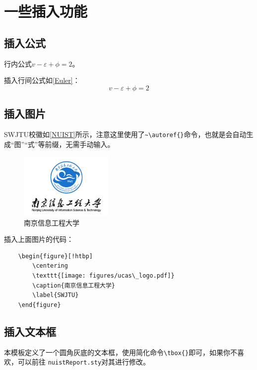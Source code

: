 \section{一些插入功能}
\subsection{插入公式}
行内公式$v-\varepsilon+\phi=2$。

插入行间公式如\autoref{Euler}：
\begin{equation}
    v-\varepsilon+\phi=2
    \label{Euler}
\end{equation}

\subsection{插入图片}
SWJTU校徽如\autoref{NUIST}所示，注意这里使用了\verb|~\autoref{}|命令，也就是会自动生成“图”“式”等前缀，无需手动输入。

\begin{figure}[!htbp]
    \centering
    \includegraphics[width =0.4\textwidth]{figures/NUIST_logo3.jpg}
    \caption{南京信息工程大学}
    \label{NUIST}
\end{figure}

插入上面图片的代码：

\begin{verbatim}
    \begin{figure}[!htbp]
        \centering
        \texttt{[image: figures/ucas\_logo.pdf]}
        \caption{南京信息工程大学}
        \label{SWJTU}
    \end{figure}
\end{verbatim}

\subsection{插入文本框}
本模板定义了一个圆角灰底的文本框，使用简化命令\verb|\tbox{}|即可，如果你不喜欢，可以前往 \texttt{nuistReport.sty}对其进行修改。


